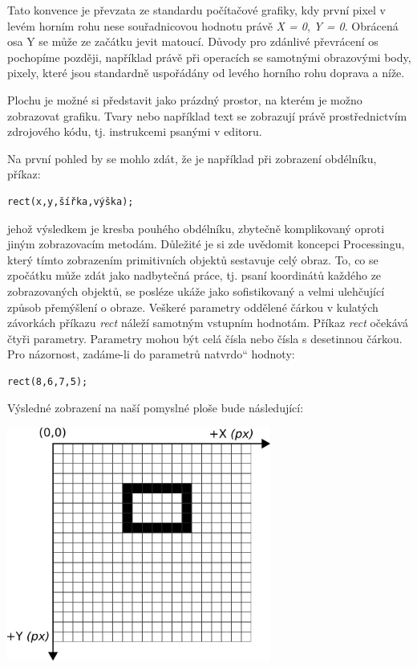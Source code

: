 \documentclass[10pt]{book}
\renewcommand\uv[1]{\quotedblbase #1\textquotedblleft}%
\begin{document}
Tato konvence je převzata ze standardu počítačové grafiky, kdy první pixel v levém horním rohu nese souřadnicovou hodnotu právě {\em X = 0}, {\em Y = 0}. Obrácená osa Y se může ze začátku jevit matoucí. Důvody pro zdánlivé převrácení os pochopíme později, například právě při operacích se samotnými obrazovými body, pixely, které jsou standardně uspořádány od levého horního rohu doprava a níže.

Plochu je možné si představit jako prázdný prostor, na kterém je možno zobrazovat grafiku. Tvary nebo například text se zobrazují právě prostřednictvím zdrojového kódu, tj. instrukcemi psanými v editoru.

Na první pohled by se mohlo zdát, že je například při zobrazení obdélníku, příkaz:

\begin{lstlisting}
rect(x,y,šířka,výška);
\end{lstlisting}

jehož výsledkem je kresba pouhého obdélníku, zbytečně komplikovaný oproti jiným zobrazovacím metodám. Důležité je si zde uvědomit koncepci Processingu, který tímto zobrazením primitivních objektů sestavuje celý obraz. To, co se zpočátku může zdát jako nadbytečná práce, tj. psaní koordinátů každého ze zobrazovaných objektů, se posléze ukáže jako sofistikovaný a velmi ulehčující způsob přemýšlení o obraze. Veškeré parametry oddělené čárkou v kulatých závorkách příkazu {\em rect} náleží samotným vstupním hodnotám. Příkaz {\em rect} očekává čtyři parametry. Parametry mohou být celá čísla nebo čísla s desetinnou čárkou. Pro názornost, zadáme-li do parametrů \uv{natvrdo} hodnoty:

\begin{lstlisting}
rect(8,6,7,5);
\end{lstlisting}

Výsledné zobrazení na naší pomyslné ploše bude následující:

\begin{center}
\includegraphics[width = 0.65\textwidth]{imgs/gridRect2d.png}
\end{center}
\end{document}

